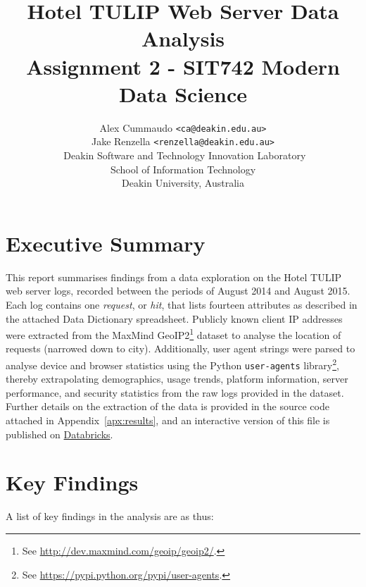 \documentclass[12pt,titlepage]{article}
\author{Alex Cummaudo \texttt{<ca@deakin.edu.au>}\\ Jake Renzella \texttt{<renzella@deakin.edu.au>}\\ Deakin Software and Technology Innovation Laboratory\\School of Information Technology\\Deakin University, Australia}
\title{Hotel TULIP Web Server Data Analysis\\\normalsize{\bfseries Assignment 2 - SIT742 Modern Data Science}}
\begin{document}
\maketitle

\section*{Executive Summary}

This report summarises findings from a data exploration on the Hotel TULIP web server logs, recorded between the periods of August 2014 and August 2015. Each log contains one \textit{request}, or \textit{hit}, that lists fourteen attributes as described in the attached Data Dictionary spreadsheet. Publicly known client IP addresses were extracted from the MaxMind GeoIP2\footnote{See \url{http://dev.maxmind.com/geoip/geoip2/}.} dataset to analyse the location of requests (narrowed down to city). Additionally, user agent strings were parsed to analyse device and browser statistics using the Python \texttt{user-agents} library\footnote{See \url{https://pypi.python.org/pypi/user-agents}.}, thereby extrapolating demographics, usage trends, platform information, server performance, and security statistics from the raw logs provided in the dataset. Further details on the extraction of the data is provided in the source code attached in Appendix~\ref{apx:results}, and an interactive version of this file is published on \href{https://databricks-prod-cloudfront.cloud.databricks.com/public/4027ec902e239c93eaaa8714f173bcfc/7364378259770565/3552971541306612/8155742302574378/latest.html}{Databricks}.

\newpage

\tableofcontents\newpage
\listoffigures\newpage

\newpage
\section{Key Findings}

A list of key findings in the analysis are as thus:
\end{document}
